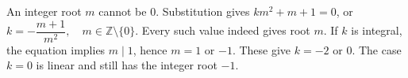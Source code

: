 An integer root $m$ cannot be $0$. Substitution gives $km^2+m+1=0$, or $\boxed{k=-\dfrac{m+1}{m^2},\quad m\in\mathbb Z\setminus\{0\}}$. Every such value indeed gives root $m$. If $k$ is integral, the equation implies $m\mid1$, hence $m=1$ or $-1$. These give $\boxed{k=-2\text{ or }0}$. The case $k=0$ is linear and still has the integer root $-1$.

